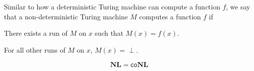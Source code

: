 \documentclass[10pt]{article}
\def\co{\mathsf{co}}
\def\NL{\mathbf{NL}}
\begin{document}
\begin{defn*}

    Similar to how a deterministic Turing machine can compute a function $f$, we say that a non-deterministic Turing machine $M$ computes a function $f$ if
    \benum
        \item There exists a run of $M$ on $x$ such that $M(x)=f(x)$.
        \item For all other runs of $M$ on $x$, $M(x)=\perp$.
    \eenum

\end{defn*}

\begin{thrm*}

    \[ \NL = \co\NL \]

\end{thrm*}
\end{document}
